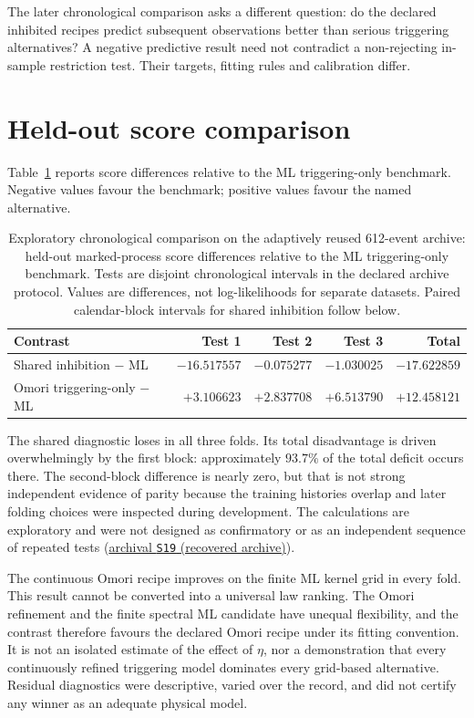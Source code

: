 The later chronological comparison asks a different question: do the declared inhibited recipes predict subsequent observations better than serious triggering alternatives? A negative predictive result need not contradict a non-rejecting in-sample restriction test. Their targets, fitting rules and calibration differ.

\section{Held-out score comparison}

Table~\ref{tab:observed-scores} reports score differences relative to the ML triggering-only benchmark. Negative values favour the benchmark; positive values favour the named alternative.

\begin{table}[!ht]
\centering
\caption{Exploratory chronological comparison on the adaptively reused 612-event archive: held-out marked-process score differences relative to the ML triggering-only benchmark. Tests are disjoint chronological intervals in the declared archive protocol. Values are differences, not log-likelihoods for separate datasets. Paired calendar-block intervals for shared inhibition follow below.}
\label{tab:observed-scores}
\small
\setlength{\tabcolsep}{4pt}
\begin{tabular}{lrrrr}
\toprule
Contrast & Test 1 & Test 2 & Test 3 & Total \\
\midrule
Shared inhibition \(-\) ML & \(-16.517557\) & \(-0.075277\) & \(-1.030025\) & \(-17.622859\) \\
Omori triggering-only \(-\) ML & \(+3.106623\) & \(+2.837708\) & \(+6.513790\) & \(+12.458121\) \\
\bottomrule
\end{tabular}
\end{table}

The shared diagnostic loses in all three folds. Its total disadvantage is driven overwhelmingly by the first block: approximately \(93.7\%\) of the total deficit occurs there. The second-block difference is nearly zero, but that is not strong independent evidence of parity because the training histories overlap and later folding choices were inspected during development. The calculations are exploratory and were not designed as confirmatory or as an independent sequence of repeated tests (\hyperlink{S19}{archival \texttt{S19} (recovered archive)}).

The continuous Omori recipe improves on the finite ML kernel grid in every fold. This result cannot be converted into a universal law ranking. The Omori refinement and the finite spectral ML candidate have unequal flexibility, and the contrast therefore favours the declared Omori recipe under its fitting convention. It is not an isolated estimate of the effect of \(\eta\), nor a demonstration that every continuously refined triggering model dominates every grid-based alternative. Residual diagnostics were descriptive, varied over the record, and did not certify any winner as an adequate physical model.



